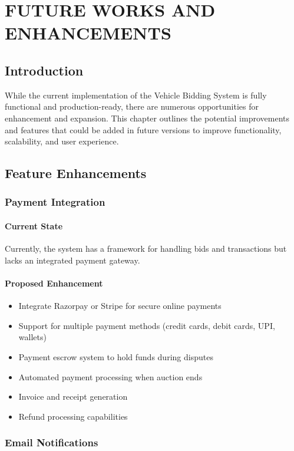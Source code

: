 \chapter{FUTURE WORKS AND ENHANCEMENTS}

\section{Introduction}

While the current implementation of the Vehicle Bidding System is fully functional and production-ready, there are numerous opportunities for enhancement and expansion. This chapter outlines the potential improvements and features that could be added in future versions to improve functionality, scalability, and user experience.

\section{Feature Enhancements}

\subsection{Payment Integration}

\subsubsection{Current State}
Currently, the system has a framework for handling bids and transactions but lacks an integrated payment gateway.

\subsubsection{Proposed Enhancement}
\begin{itemize}
    \item Integrate Razorpay or Stripe for secure online payments
    \item Support for multiple payment methods (credit cards, debit cards, UPI, wallets)
    \item Payment escrow system to hold funds during disputes
    \item Automated payment processing when auction ends
    \item Invoice and receipt generation
    \item Refund processing capabilities
\end{itemize}

\subsection{Email Notifications}

